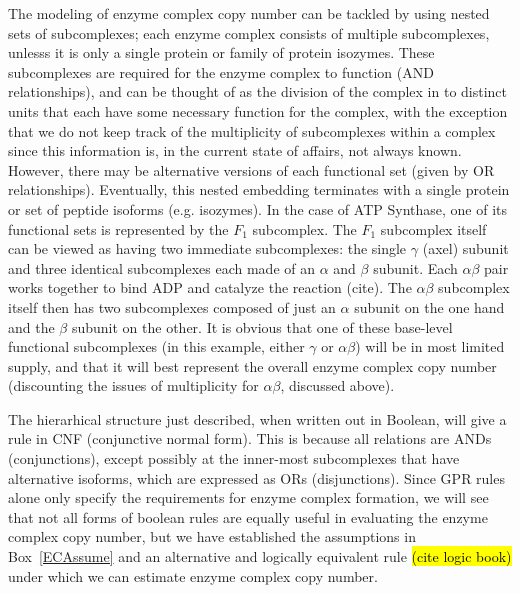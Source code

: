 \documentclass[phd,tocprelim]{cornell}
\theoremstyle{break}
\theoremstyle{empty}
\begin{document}
The modeling of enzyme complex copy number can be tackled by using
nested sets of subcomplexes; each enzyme complex consists of multiple
subcomplexes, unlesss it is only a single protein or family of protein
isozymes.  These subcomplexes are required for the enzyme complex to
function (AND relationships), and can be thought of as the division of
the complex in to distinct units that each have some necessary
function for the complex, with the exception that we do not keep track
of the multiplicity of subcomplexes within a complex since this
information is, in the current state of affairs, not always known.
However, there may be alternative versions of each functional set
(given by OR relationships). Eventually, this nested embedding
terminates with a single protein or set of peptide isoforms
(e.g. isozymes).  In the case of ATP Synthase, one of its functional
sets is represented by the $F_1$ subcomplex. The $F_1$ subcomplex
itself can be viewed as having two immediate subcomplexes: the single
$\gamma$ (axel) subunit and three identical subcomplexes each made of
an $\alpha$ and $\beta$ subunit. Each $\alpha\beta$ pair works
together to bind ADP and catalyze the reaction (cite). The
$\alpha\beta$ subcomplex itself then has two subcomplexes composed of
just an $\alpha$ subunit on the one hand and the $\beta$ subunit on
the other.  It is obvious that one of these base-level functional
subcomplexes (in this example, either $\gamma$ or $\alpha\beta$) will
be in most limited supply, and that it will best represent the overall
enzyme complex copy number (discounting the issues of multiplicity for
$\alpha\beta$, discussed above).

%
%

The hierarhical structure just described, when written out in Boolean,
will give a rule in CNF (conjunctive normal form). This is because all
relations are ANDs (conjunctions), except possibly at the inner-most
subcomplexes that have alternative isoforms, which are expressed as
ORs (disjunctions). Since GPR rules alone only specify the
requirements for enzyme complex formation, we will see that not all
forms of boolean rules are equally useful in evaluating the enzyme
complex copy number, but we have established the assumptions in
Box~\ref{ECAssume} and an alternative and logically equivalent rule
\hl{(cite logic book)} under which we can estimate enzyme complex copy
number.
\end{document}
